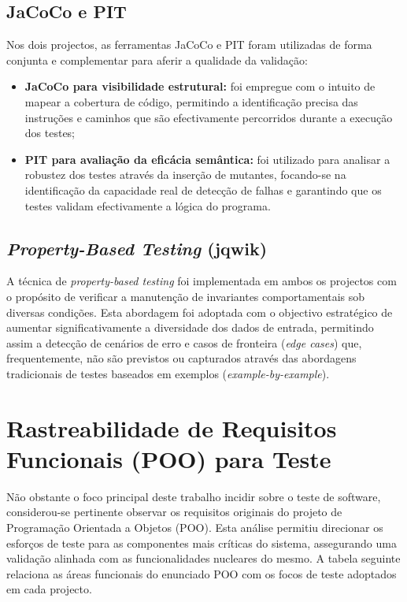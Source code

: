 \documentclass{article}
\begin{document}
\subsection{JaCoCo e PIT}

Nos dois projectos, as ferramentas JaCoCo e PIT foram utilizadas de forma conjunta e complementar para aferir a qualidade da validação:
\begin{itemize}
    \item \textbf{JaCoCo para visibilidade estrutural:} foi empregue com o intuito de mapear a cobertura de código, permitindo a identificação precisa das instruções e caminhos que são efectivamente percorridos durante a execução dos testes;
    \item \textbf{PIT para avaliação da eficácia semântica:} foi utilizado para analisar a robustez dos testes através da inserção de mutantes, focando-se na identificação da capacidade real de detecção de falhas e garantindo que os testes validam efectivamente a lógica do programa.
\end{itemize}

\subsection{\emph{Property-Based Testing} (jqwik)}

A técnica de \emph{property-based testing} foi implementada em ambos os projectos com o propósito de verificar a manutenção de invariantes comportamentais sob diversas condições. Esta abordagem foi adoptada com o objectivo estratégico de aumentar significativamente a diversidade dos dados de entrada, permitindo assim a detecção de cenários de erro e casos de fronteira (\emph{edge cases}) que, frequentemente, não são previstos ou capturados através das abordagens tradicionais de testes baseados em exemplos (\emph{example-by-example}).

\section{Rastreabilidade de Requisitos Funcionais (POO) para Teste}

Não obstante o foco principal deste trabalho incidir sobre o teste de software, considerou-se pertinente observar os requisitos originais do projeto de Programação Orientada a Objetos (POO). Esta análise permitiu direcionar os esforços de teste para as componentes mais críticas do sistema, assegurando uma validação alinhada com as funcionalidades nucleares do mesmo.
A tabela seguinte relaciona as áreas funcionais do enunciado POO com os focos de teste adoptados em cada projecto.
\end{document}
